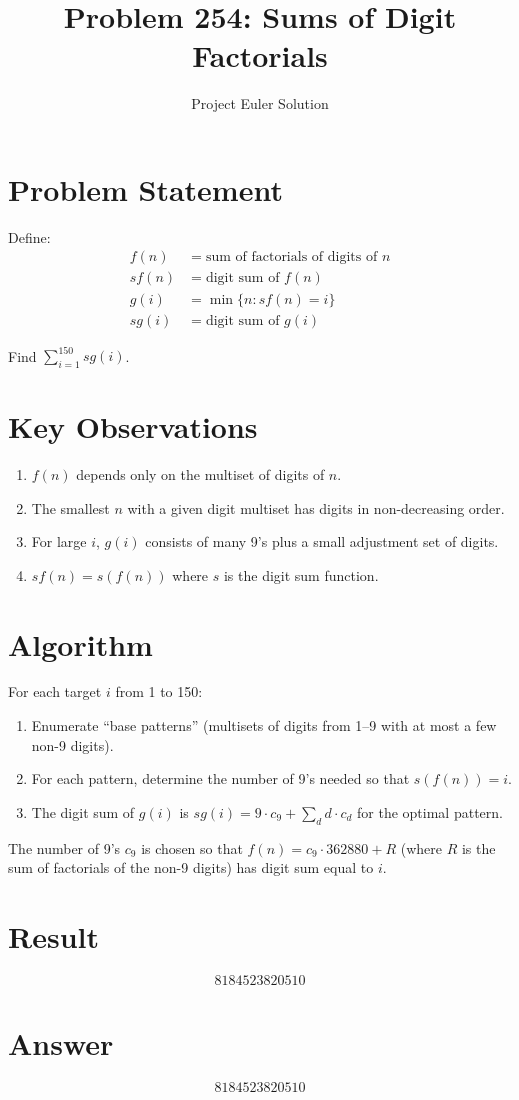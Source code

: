 \documentclass[12pt]{article}
\title{Problem 254: Sums of Digit Factorials}
\author{Project Euler Solution}
\date{}
\begin{document}
\maketitle

\section{Problem Statement}
Define:
\begin{align}
f(n) &= \text{sum of factorials of digits of } n \\
sf(n) &= \text{digit sum of } f(n) \\
g(i) &= \min\{n : sf(n) = i\} \\
sg(i) &= \text{digit sum of } g(i)
\end{align}

Find $\displaystyle\sum_{i=1}^{150} sg(i)$.

\section{Key Observations}

\begin{enumerate}
    \item $f(n)$ depends only on the multiset of digits of $n$.
    \item The smallest $n$ with a given digit multiset has digits in non-decreasing order.
    \item For large $i$, $g(i)$ consists of many 9's plus a small adjustment set of digits.
    \item $sf(n) = s(f(n))$ where $s$ is the digit sum function.
\end{enumerate}

\section{Algorithm}

For each target $i$ from 1 to 150:
\begin{enumerate}
    \item Enumerate ``base patterns'' (multisets of digits from 1--9 with at most a few non-9 digits).
    \item For each pattern, determine the number of 9's needed so that $s(f(n)) = i$.
    \item The digit sum of $g(i)$ is $sg(i) = 9 \cdot c_9 + \sum_{d} d \cdot c_d$ for the optimal pattern.
\end{enumerate}

The number of 9's $c_9$ is chosen so that $f(n) = c_9 \cdot 362880 + R$ (where $R$ is the sum of factorials of the non-9 digits) has digit sum equal to $i$.

\section{Result}
\[
\boxed{8184523820510}
\]

\section{Answer}

\[
\boxed{8184523820510}
\]
\end{document}
